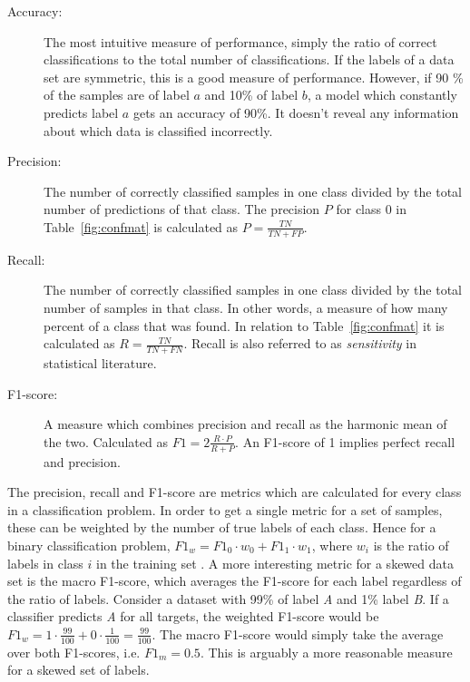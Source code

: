 \begin{description}
    \item[Accuracy:] The most intuitive measure of performance, simply the ratio of correct classifications to the total number of classifications. If the labels of a data set are symmetric, this is a good measure of performance. However, if 90 \%  of the samples are of label $a$ and 10\% of label $b$, a model which constantly predicts label $a$ gets an accuracy of 90\%. It doesn't reveal any information about which data is classified incorrectly. 
    \item[Precision:] The number of correctly classified samples in one class divided by the total number of predictions of that class. The precision $P$ for class 0 in Table~\ref{fig:confmat} is calculated as $\displaystyle{P = \frac{TN}{TN + FP}}$. 
    \item[Recall:] The number of correctly classified samples in one class divided by the total number of samples in that class. In other words, a measure of how many percent of a class that was found. In relation to Table~\ref{fig:confmat} it is calculated as $\displaystyle{R = \frac{TN}{TN + FN}}$. Recall is also referred to as \textit{sensitivity} in statistical literature. 
    \item[F1-score:] A measure which combines precision and recall as the harmonic mean of the two. Calculated as $\displaystyle{F1 = 2 \frac{R \cdot P}{R + P}}$. An F1-score of 1 implies perfect recall and precision.
\end{description}

The precision, recall and F1-score are metrics which are calculated for every class in a classification problem. In order to get a single metric for a set of samples, these can be weighted by the number of true labels of each class. Hence for a binary classification problem, $F1_w = F1_0 \cdot w_0 + F1_1 \cdot w_1$, where $w_i$ is the ratio of labels in class $i$ in the training set \citep{Ting2017}. A more interesting metric for a skewed data set is the macro F1-score, which averages the F1-score for each label regardless of the ratio of labels. Consider a dataset with 99\% of label \emph{A} and 1\% label \emph{B}. If a classifier predicts \emph{A} for all targets, the weighted F1-score would be $\displaystyle{F1_w = 1 \cdot \frac{99}{100} + 0 \cdot \frac{1}{100} = \frac{99}{100}}$. The macro F1-score would simply take the average over both F1-scores, i.e. $F1_m = 0.5$. This is arguably a more reasonable measure for a skewed set of labels. 

